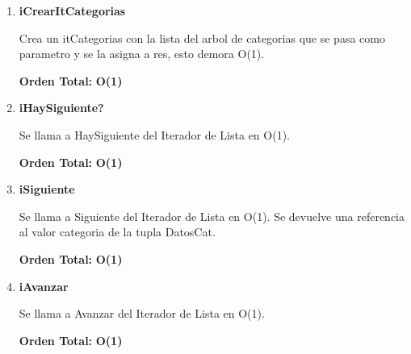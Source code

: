 \vspace*{1em}
\begin{enumerate}

\item\textbf{iCrearItCategorias}
\par Crea un itCategorias con la lista del arbol de categorias que se pasa como parametro y se la asigna a res, esto demora O(1).
\par \textbf{Orden Total:} \textbf{O(1)}

\item\textbf{iHaySiguiente?}
\par Se llama a HaySiguiente del Iterador de Lista en O(1).
\par \textbf{Orden Total:} \textbf{O(1)}

\item\textbf{iSiguiente}
\par Se llama a Siguiente del Iterador de Lista en O(1). Se devuelve una referencia al valor categoria de la tupla DatosCat.
\par \textbf{Orden Total:} \textbf{O(1)}

\item\textbf{iAvanzar}
\par Se llama a Avanzar del Iterador de Lista en O(1).
\par \textbf{Orden Total:} \textbf{O(1)}

\end{enumerate}



